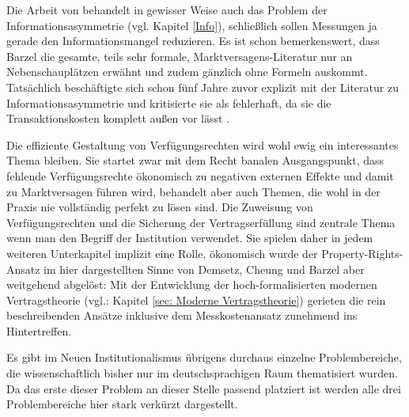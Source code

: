 Die Arbeit von \Textcite{Barzel1982} behandelt in gewisser Weise auch das Problem der Informationsasymmetrie (vgl. Kapitel \ref{Info}), schließlich sollen Messungen ja gerade den Informationsmangel reduzieren. Es ist schon bemerkenswert, dass Barzel die gesamte, teils sehr formale, Marktversagens-Literatur nur an Nebenschauplätzen erwähnt und zudem gänzlich ohne Formeln auskommt. Tatsächlich beschäftigte sich \textcite{Barzel1977} schon fünf Jahre zuvor explizit mit der Literatur zu Informationsasymmetrie und kritisierte sie als fehlerhaft, da sie die Transaktionskosten komplett außen vor lässt \parencite[S. 6]{Allen2024}. 

Die effiziente Gestaltung von Verfügungsrechten wird wohl ewig ein interessantes Thema bleiben. Sie startet zwar mit dem Recht banalen Ausgangspunkt, dass fehlende Verfügungsrechte ökonomisch zu negativen externen Effekte und damit zu Marktversagen führen wird, behandelt aber auch Themen, die wohl in der Praxis nie vollständig perfekt zu lösen sind. Die Zuweisung von Verfügungsrechten und die Sicherung der Vertragserfüllung sind zentrale Thema wenn man den Begriff der Institution verwendet. Sie spielen daher in jedem weiteren Unterkapitel implizit eine Rolle, ökonomisch wurde der Property-Rights-Ansatz im hier dargestellten Sinne von Demsetz, Cheung und Barzel aber weitgehend abgelöst: Mit der Entwicklung der hoch-formalisierten modernen Vertragstheorie (vgl.: Kapitel \ref{sec: Moderne Vertragstheorie}) gerieten die rein beschreibenden Ansätze inklusive dem Messkostenansatz zunehmend ins Hintertreffen. 

Es gibt im Neuen Institutionalismus übrigens durchaus einzelne Problembereiche, die wissenschaftlich bisher nur im deutschsprachigen Raum thematisiert wurden. Da das erste dieser Problem an dieser Stelle passend platziert ist werden alle drei Problembereiche hier stark verkürzt dargestellt. 

